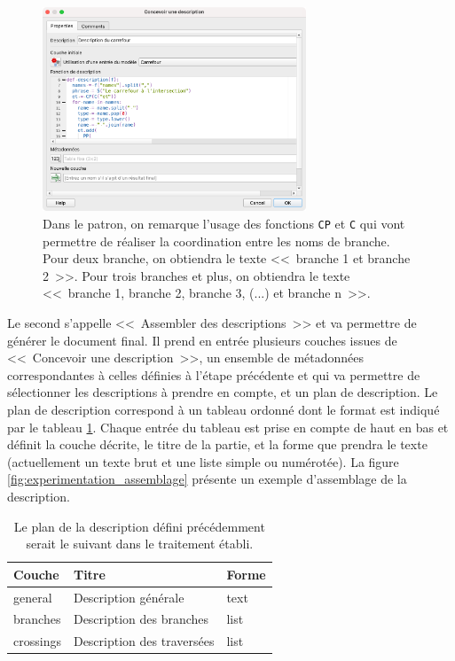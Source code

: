 \begin{figure}[ht]
    \centering
    \includegraphics[width=0.7\textwidth]{images/experimentation/qgis2desc_conception.png}
    \caption[Fenêtre QGIS de conception de description]{Dans le patron, on remarque l'usage des fonctions \texttt{CP} et \texttt{C} qui vont permettre de réaliser la coordination entre les noms de branche. Pour deux branche, on obtiendra le texte <<~branche 1 et branche 2~>>. Pour trois branches et plus, on obtiendra le texte <<~branche 1, branche 2, branche 3, (...) et branche n~>>.}
    \label{fig:experimentation_qgis2desc_conception}
\end{figure}

\newpar{}

Le second s'appelle <<~Assembler des descriptions~>> et va permettre de générer le document final. Il prend en entrée plusieurs couches issues de <<~Concevoir une description~>>, un ensemble de métadonnées correspondantes à celles définies à l'étape précédente et qui va permettre de sélectionner les descriptions à prendre en compte, et un plan de description. Le plan de description correspond à un tableau ordonné dont le format est indiqué par le tableau \ref{experimentation:table_plan_description}. Chaque entrée du tableau est prise en compte de haut en bas et définit la couche décrite, le titre de la partie, et la forme que prendra le texte (actuellement un texte brut et une liste simple ou numérotée). La figure \ref{fig:experimentation_assemblage} présente un exemple d'assemblage de la description.

\begin{table}[ht]
    \begin{center}
    \footnotesize
    \begin{tabular}{ | l | l | l | }
        Couche & Titre & Forme\tabularnewline
        \hline
        general & Description générale & text\\
        branches & Description des branches & list\\
        crossings & Description des traversées & list
    \end{tabular}
    \end{center}
    \caption[Schéma tabulaire du plan de la description]{Le plan de la description défini précédemment serait le suivant dans le traitement établi.}
    \label{experimentation:table_plan_description}
\end{table}

